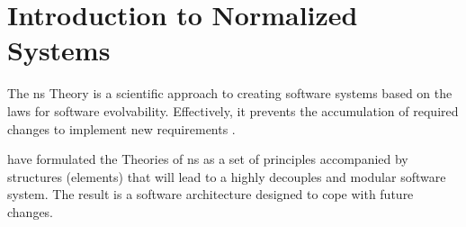 \section{Introduction to Normalized Systems} \label{sec_inro_ns}

The \gls{ns} Theory is a scientific approach to creating software systems based on the
laws for software evolvability. Effectively, it prevents the accumulation of required
changes to implement new requirements \parencite[]{mannaert_normalized_2009}. 

\textcite[]{mannaert_normalized_2009} have formulated the Theories of \gls{ns} as a set of
principles accompanied by structures (elements) that will lead to a highly decouples and
modular software system. The result is a software architecture designed to cope with
future changes.